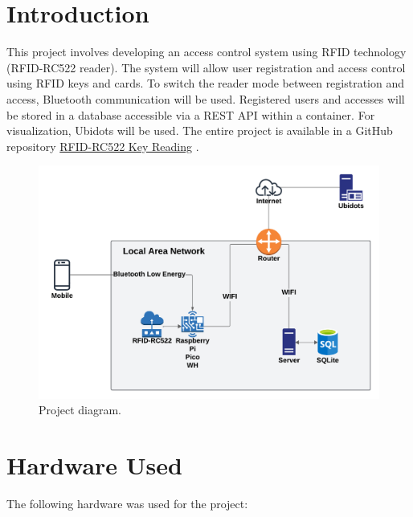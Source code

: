 \documentclass{article}
\begin{document}
\tableofcontents

\newpage


\section{Introduction}

This project involves developing an access control system using RFID technology (RFID-RC522 reader).
The system will allow user registration and access control using RFID keys and cards. 
To switch the reader mode between registration and access, Bluetooth communication will be used. 
Registered users and accesses will be stored in a database accessible via a REST API within a container. 
For visualization, Ubidots will be used.
The entire project is available in a GitHub repository \href{https://github.com/AbelHaro/RFID-RC522-Key-Reading}{RFID-RC522 Key Reading} \cite{abelharo2024lectura}.

\begin{figure}[H]
\centering
\includegraphics[width=0.9\linewidth]{../images/esquema_proyecto.png}
\caption{\label{fig:esquema red}Project diagram.}
\end{figure}

\section{Hardware Used}
The following hardware was used for the project:
\end{document}
